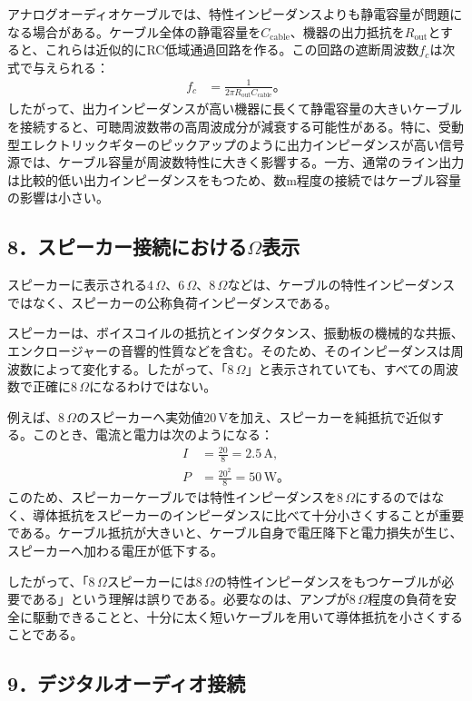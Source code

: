 \documentclass[platex,dvipdfmx,a4paper]{jsarticle}
\begin{document}
アナログオーディオケーブルでは、特性インピーダンスよりも静電容量が問題になる場合がある。ケーブル全体の静電容量を$C_{\mathrm{cable}}$、機器の出力抵抗を$R_{\mathrm{out}}$とすると、これらは近似的にRC低域通過回路を作る。この回路の遮断周波数$f_c$は次式で与えられる：
\begin{align*}
  f_c
  &=\frac{1}{2\pi R_{\mathrm{out}}C_{\mathrm{cable}}}。
\end{align*}
したがって、出力インピーダンスが高い機器に長くて静電容量の大きいケーブルを接続すると、可聴周波数帯の高周波成分が減衰する可能性がある。特に、受動型エレクトリックギターのピックアップのように出力インピーダンスが高い信号源では、ケーブル容量が周波数特性に大きく影響する。一方、通常のライン出力は比較的低い出力インピーダンスをもつため、数$\mathrm{m}$程度の接続ではケーブル容量の影響は小さい。

\subsection*{8．スピーカー接続における$\Omega$表示}

スピーカーに表示される$4\,\Omega$、$6\,\Omega$、$8\,\Omega$などは、ケーブルの特性インピーダンスではなく、スピーカーの公称負荷インピーダンスである。

スピーカーは、ボイスコイルの抵抗とインダクタンス、振動板の機械的な共振、エンクロージャーの音響的性質などを含む。そのため、そのインピーダンスは周波数によって変化する。したがって、「$8\,\Omega$」と表示されていても、すべての周波数で正確に$8\,\Omega$になるわけではない。

例えば、$8\,\Omega$のスピーカーへ実効値$20\,\mathrm{V}$を加え、スピーカーを純抵抗で近似する。このとき、電流と電力は次のようになる：
\begin{align*}
  I
  &=\frac{20}{8}
   =2.5\,\mathrm{A}, \\
  P
  &=\frac{20^2}{8}
   =50\,\mathrm{W}。
\end{align*}
このため、スピーカーケーブルでは特性インピーダンスを$8\,\Omega$にするのではなく、導体抵抗をスピーカーのインピーダンスに比べて十分小さくすることが重要である。ケーブル抵抗が大きいと、ケーブル自身で電圧降下と電力損失が生じ、スピーカーへ加わる電圧が低下する。

したがって、「$8\,\Omega$スピーカーには$8\,\Omega$の特性インピーダンスをもつケーブルが必要である」という理解は誤りである。必要なのは、アンプが$8\,\Omega$程度の負荷を安全に駆動できることと、十分に太く短いケーブルを用いて導体抵抗を小さくすることである。

\subsection*{9．デジタルオーディオ接続}
\end{document}
